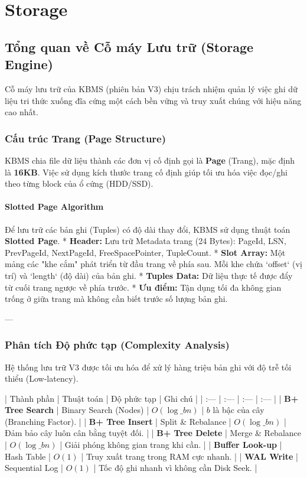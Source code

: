 \chapter{Storage}
\section{Tổng quan về Cỗ máy Lưu trữ (Storage Engine)}

Cỗ máy lưu trữ của KBMS (phiên bản V3) chịu trách nhiệm quản lý việc ghi dữ liệu tri thức xuống đĩa cứng một cách bền vững và truy xuất chúng với hiệu năng cao nhất.

\subsection{Cấu trúc Trang (Page Structure)}

KBMS chia file dữ liệu thành các đơn vị cố định gọi là \textbf{Page} (Trang), mặc định là \textbf{16KB}. Việc sử dụng kích thước trang cố định giúp tối ưu hóa việc đọc/ghi theo từng block của ổ cứng (HDD/SSD).

\subsubsection{Slotted Page Algorithm}
Để lưu trữ các bản ghi (Tuples) có độ dài thay đổi, KBMS sử dụng thuật toán \textbf{Slotted Page}.
*   \textbf{Header:} Lưu trữ Metadata trang (24 Bytes): PageId, LSN, PrevPageId, NextPageId, FreeSpacePointer, TupleCount.
*   \textbf{Slot Array:} Một mảng các "khe cắm" phát triển từ đầu trang về phía sau. Mỗi khe chứa `offset` (vị trí) và `length` (độ dài) của bản ghi.
*   \textbf{Tuples Data:} Dữ liệu thực tế được đẩy từ cuối trang ngược về phía trước.
*   \textbf{Ưu điểm:} Tận dụng tối đa không gian trống ở giữa trang mà không cần biết trước số lượng bản ghi.

---

\subsection{Phân tích Độ phức tạp (Complexity Analysis)}

Hệ thống lưu trữ V3 được tối ưu hóa để xử lý hàng triệu bản ghi với độ trễ tối thiểu (Low-latency).

| Thành phần | Thuật toán | Độ phức tạp | Ghi chú |
| :--- | :--- | :--- | :--- |
| \textbf{B+ Tree Search} | Binary Search (Nodes) | $O(\log\_b n)$ | $b$ là bậc của cây (Branching Factor). |
| \textbf{B+ Tree Insert} | Split \& Rebalance | $O(\log\_b n)$ | Đảm bảo cây luôn cân bằng tuyệt đối. |
| \textbf{B+ Tree Delete} | Merge \& Rebalance | $O(\log\_b n)$ | Giải phóng không gian trang khi cần. |
| \textbf{Buffer Look-up} | Hash Table | $O(1)$ | Truy xuất trang trong RAM cực nhanh. |
| \textbf{WAL Write} | Sequential Log | $O(1)$ | Tốc độ ghi nhanh vì không cần Disk Seek. |

